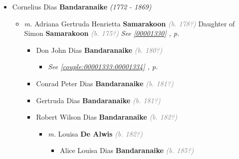 \documentclass[10pt, openany]{book}
\begin{document}
\begin{itemize}
{\begin{itemize}
{\begin{itemize}
{\begin{itemize}
\item{Daughter \textbf{Panditharatne} \textcolor{gray}{\textit{(b. 182?)}}
 }
\item{John Leonard Wijekoon Phillipsz \textbf{Panditharatne} \textcolor{gray}{\textit{(b. 182?)}}
    }
\end{itemize}}
\end{itemize}
 }
\item{Cornelius Dias \textbf{Bandaranaike} \textcolor{slorange}{\textit{(1772 - 1869)}}
\begin{itemize}
\item{\textit{m.} Adriana Gertruda Henrietta \textbf{Samarakoon} \textcolor{gray}{\textit{(b. 178?)}} Daughter of  Simon \textbf{Samarakoon} \textcolor{gray}{\textit{(b. 175?)}} \textcolor{slteal}{\textit{See  \autoref{00001330} \textit{, p. \pageref{00001330} }}}   \label{couple:00001328:00001329} \begin{itemize}
\item{Don John Dias \textbf{Bandaranaike} \textcolor{gray}{\textit{(b. 180?)}}
\begin{itemize}
\item{\textcolor{slteal}{\textit{See  \autoref{couple:00001333:00001334} \textit{, p. \pageref{couple:00001333:00001334} }}}}
\end{itemize}
   }
\item{Conrad Peter Dias \textbf{Bandaranaike} \textcolor{gray}{\textit{(b. 181?)}}
   }
\item{Gertruda Dias \textbf{Bandaranaike} \textcolor{gray}{\textit{(b. 181?)}}
  }
\item{Robert Wilson Dias \textbf{Bandaranaike} \textcolor{gray}{\textit{(b. 182?)}}
\begin{itemize}
\item{\textit{m.} Louisa \textbf{De Alwis} \textcolor{gray}{\textit{(b. 182?)}}   \label{couple:00001339:00001340} \begin{itemize}
\item{Alice Louisa Dias \textbf{Bandaranaike} \textcolor{gray}{\textit{(b. 185?)}}
   }
\end{itemize}}
\end{itemize}
}
\end{itemize}}
\end{itemize}}
\end{itemize}}
\end{itemize}
\end{document}
